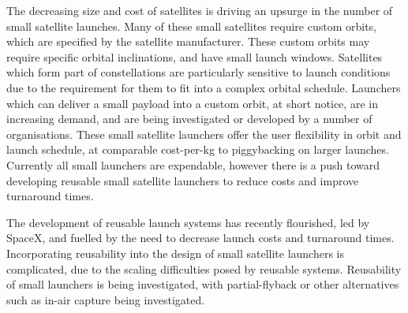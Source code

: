 \documentclass[conf]{new-aiaa}
\begin{document}
The decreasing size and cost of satellites is driving an upsurge in the number of small satellite launches\cite{Faa&Ast&Comstac2015}\cite{Maddock2016}. Many of these small satellites require custom orbits, which are specified by the satellite manufacturer. These custom orbits may require specific orbital inclinations, and have small launch windows. Satellites which form part of constellations are particularly sensitive to launch conditions due to the requirement for them to fit into a complex orbital schedule\cite{Crisp2015}. Launchers which can deliver a small payload into a custom orbit, at short notice, are in increasing demand, and are being investigated or developed by a number of organisations\cite{Maddock2017,Kuhn2017,DARPA2017,charania,Gilmour}. These small satellite launchers offer the user flexibility in orbit and launch schedule, at comparable cost-per-kg to piggybacking on larger launches. Currently all small launchers are expendable, however there is a push toward developing reusable small satellite launchers to reduce costs and improve turnaround times.

The development of reusable launch systems has recently flourished, led by SpaceX, and fuelled by the need to decrease launch costs and turnaround times. Incorporating reusability into the design of small satellite launchers is complicated, due to the scaling difficulties posed by reusable systems. Reusability of small launchers is being investigated, with partial-flyback\cite{Adeline} or other alternatives such as in-air capture \cite{Sippel2001} being investigated. 
 
\end{document}
